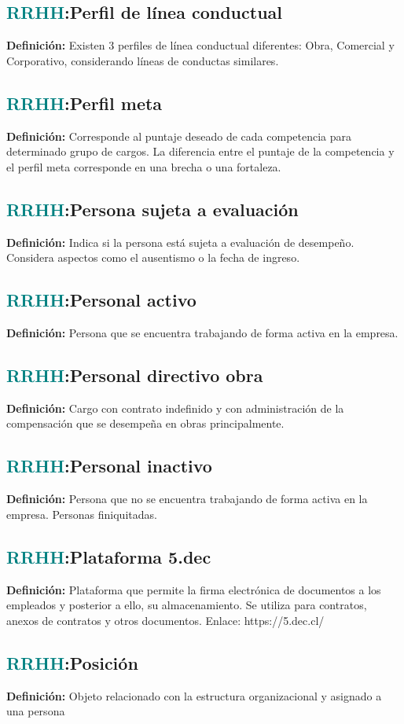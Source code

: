\documentclass[12pt]{article}
\begin{document}
\subsection{\textcolor{teal}{RRHH}:{Perfil de línea conductual}}
\textbf{Definición:} Existen 3 perfiles de línea conductual diferentes: Obra, Comercial y Corporativo, considerando líneas de conductas similares.
\subsection{\textcolor{teal}{RRHH}:{Perfil meta}}
\textbf{Definición:} Corresponde al puntaje deseado de cada competencia para determinado grupo de cargos. La diferencia entre el puntaje de la competencia y el perfil meta corresponde en una brecha o una fortaleza.
\subsection{\textcolor{teal}{RRHH}:{Persona sujeta a evaluación}}
\textbf{Definición:} Indica si la persona está sujeta a evaluación de desempeño. Considera aspectos como el ausentismo o la fecha de ingreso.
\subsection{\textcolor{teal}{RRHH}:{Personal activo}}
\textbf{Definición:} Persona que se encuentra trabajando de forma activa en la empresa.
\subsection{\textcolor{teal}{RRHH}:{Personal directivo obra}}
\textbf{Definición:} Cargo con contrato indefinido y con administración de la compensación que se desempeña en obras principalmente.
\subsection{\textcolor{teal}{RRHH}:{Personal inactivo}}
\textbf{Definición:} Persona que no se encuentra trabajando de forma activa en la empresa. Personas finiquitadas.
\subsection{\textcolor{teal}{RRHH}:{Plataforma 5.dec}}
\textbf{Definición:} Plataforma que permite la firma electrónica de documentos a los empleados y posterior a ello, su almacenamiento. Se utiliza para contratos, anexos de contratos y otros documentos. 
Enlace: https://5.dec.cl/
\subsection{\textcolor{teal}{RRHH}:{Posición}}
\textbf{Definición:} Objeto relacionado con la estructura organizacional y asignado a una persona
\end{document}

